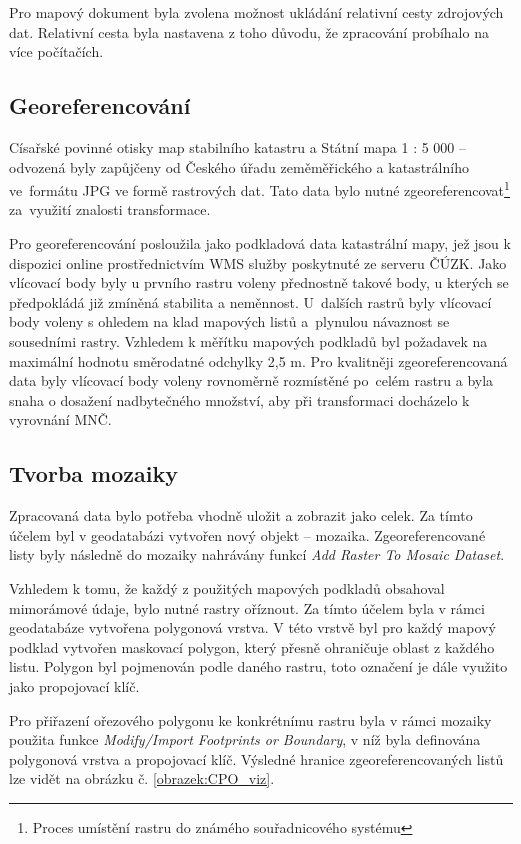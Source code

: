\documentclass[thesis=M,czech]{FITthesis}[2012/06/26]
\begin{document}
Pro mapový dokument byla zvolena možnost ukládání relativní cesty zdrojových dat. Relativní cesta byla nastavena z toho důvodu, že zpracování probíhalo na více počítačích. 


\subsection{Georeferencování}

Císařské povinné otisky map stabilního katastru a Státní mapa 1 : 5 000 – odvozená byly zapůjčeny od Českého úřadu zeměměřického a katastrálního ve~formátu JPG ve formě rastrových dat. Tato data bylo nutné zgeoreferencovat\footnote{Proces umístění rastru do známého souřadnicového systému} za~využití znalosti transformace. 

Pro georeferencování posloužila jako podkladová data katastrální mapy, jež jsou k dispozici online prostřednictvím WMS služby poskytnuté ze serveru ČÚZK.  Jako vlícovací body byly u prvního rastru voleny přednostně takové body, u kterých se předpokládá již zmíněná stabilita a neměnnost. U~dalších rastrů byly vlícovací body voleny s ohledem na klad mapových listů a~plynulou návaznost se sousedními rastry. Vzhledem k měřítku mapových podkladů byl požadavek na maximální hodnotu směrodatné odchylky 2,5 m. Pro kvalitněji zgeoreferencovaná data byly vlícovací body voleny rovnoměrně rozmístěné po~celém rastru a byla snaha o dosažení nadbytečného množství, aby při transformaci docházelo k vyrovnání MNČ. 


\subsection{Tvorba mozaiky}
Zpracovaná data bylo potřeba vhodně uložit a zobrazit jako celek. Za tímto účelem byl v geodatabázi vytvořen nový objekt – mozaika. Zgeoreferencované listy byly následně do mozaiky nahrávány funkcí \textit{Add Raster To Mosaic Dataset}.

Vzhledem k tomu, že každý z použitých mapových podkladů obsahoval mimorámové údaje, bylo nutné rastry oříznout. Za tímto účelem byla v rámci geodatabáze vytvořena polygonová vrstva. V této vrstvě byl pro každý mapový podklad vytvořen maskovací polygon, který přesně ohraničuje oblast z každého listu. Polygon byl pojmenován podle daného rastru, toto označení je dále využito jako propojovací klíč. 

Pro přiřazení ořezového polygonu ke konkrétnímu rastru byla v rámci mozaiky použita funkce \textit{Modify/Import Footprints or Boundary}, v níž byla definována polygonová vrstva a propojovací klíč. Výsledné hranice zgeoreferencovaných listů lze vidět na obrázku č. \ref{obrazek:CPO_viz}. 
\end{document}
